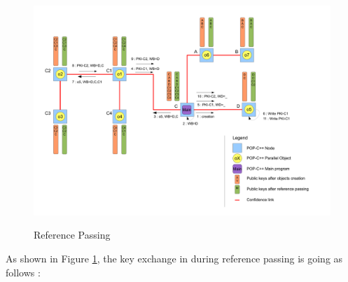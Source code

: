 \begin{figure}[ht]
	\caption{Reference Passing}
  	\centering
	\includegraphics[width=1.0\textwidth]{../ref_passing_impl.pdf}
	\label{fig:ref_passing_impl}
\end{figure}

 As shown in Figure \ref{fig:ref_passing_impl}, the key exchange in during reference passing is going as follows : 

